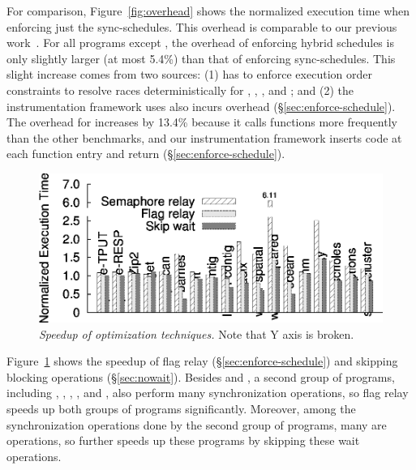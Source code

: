 For comparison, Figure~\ref{fig:overhead} shows the normalized
execution time when enforcing just the sync-schedules.  This overhead is
comparable to our previous work~\cite{cui:tern:osdi10}.  For all
programs except \watern, the overhead of enforcing hybrid schedules is only slightly
larger (at most 5.4\%) than that of enforcing sync-schedules.
This slight increase comes from two sources: (1) \peregrine has to enforce
execution order constraints to resolve races deterministically for \pbzip,
 \barnes, \fft, and \lun; and (2) the instrumentation framework \peregrine uses
also incurs overhead (\S\ref{sec:enforce-schedule}). 
The overhead for \watern increases by 13.4\% because it calls functions
more frequently than the other benchmarks, and our instrumentation framework
inserts code at each function entry and return
(\S\ref{sec:enforce-schedule}).




\begin{figure}[b!]
\centering
\includegraphics[width=\columnwidth]{peregrine/figures/opt.eps}
\vspace{-.3in}
\caption{{\em Speedup of optimization techniques.} Note that Y axis is
  broken.} \label{fig:opt}
\end{figure}

Figure~\ref{fig:opt} shows the speedup of flag relay
(\S\ref{sec:enforce-schedule}) and skipping blocking operations
(\S\ref{sec:nowait}).  Besides \watern and \cholesky, a
second group of programs, including \barnes, \lun, \radix, \waters, and
\ocean, also perform many synchronization operations, so flag relay speeds up
both groups of programs significantly.  Moreover, among the
synchronization operations done by the second group of programs, many are
 operations, so \peregrine further speeds up these
programs by skipping these wait operations.

